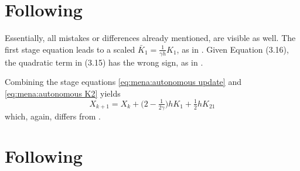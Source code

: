 \section{Following \cite{MPIMD12-13}}

Essentially, all mistakes or differences already mentioned, are visible as well.
The first stage equation \cite[Equation (3.14)]{MPIMD12-13} leads to a scaled $\bar{K}_1 = \frac{1}{\gamma h}K_1$, as in \cite{MPIMD11-06}.
Given Equation (3.16), the quadratic term in (3.15) has the wrong sign, as in \cite{Mena2007}.

Combining the stage equations \eqref{eq:mena:autonomous update} and \eqref{eq:mena:autonomous K2} yields
\begin{equation}
  X_{k+1} = X_k + \big( 2 - \tfrac{1}{2\gamma} \big) h K_1 + \tfrac{1}{2} h K_{21}
\end{equation}
which, again, differs from \cite[Equation~(3.17)]{MPIMD12-13}.

\section{Following \cite{Lang2015}}

